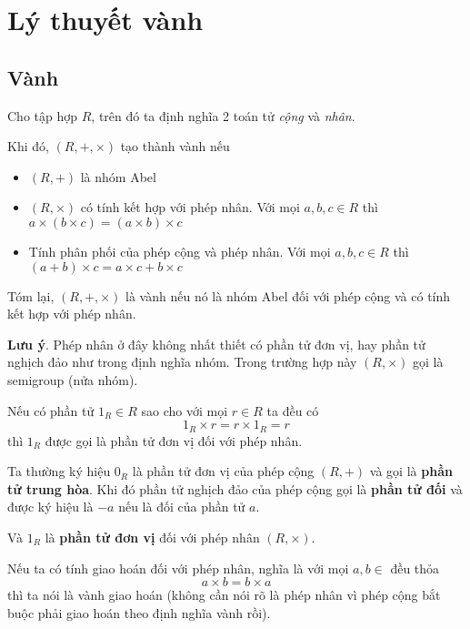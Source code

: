 \chapter{Lý thuyết vành}

\section{Vành}

\begin{definition}
    Cho tập hợp $R$, trên đó ta định nghĩa 2 toán tử \textit{cộng} và \textit{nhân}.

    Khi đó, $(R, +, \times)$ tạo thành vành nếu

    \begin{itemize}
        \item $(R, +)$ là nhóm Abel
        \item $(R, \times)$ có tính kết hợp với phép nhân. Với mọi $a, b, c \in R$ thì $a \times (b \times c) = (a \times b) \times c$
        \item Tính phân phối của phép cộng và phép nhân. Với mọi $a, b, c \in R$ thì $(a + b) \times c = a \times c + b \times c$
    \end{itemize}
\end{definition}

Tóm lại, $(R, +, \times)$ là vành nếu nó là nhóm Abel đối với phép cộng và có tính kết hợp với phép nhân.

\textbf{Lưu ý}. Phép nhân ở đây không nhất thiết có phần tử đơn vị, hay phần tử nghịch đảo như trong định nghĩa nhóm. Trong trường hợp này $(R, \times)$ gọi là semigroup (nửa nhóm).

\begin{definition} Nếu có phần tử $1_R \in R$ sao cho với mọi $r \in R$ ta đều có
    \[1_R \times r = r \times 1_R = r\]
    thì $1_R$ được gọi là phần tử đơn vị đối với phép nhân.
\end{definition}

Ta thường ký hiệu $0_R$ là phần tử đơn vị của phép cộng $(R, +)$ và gọi là \textbf{phần tử trung hòa}.
Khi đó phần tử nghịch đảo của phép cộng gọi là \textbf{phần tử đối} và được ký hiệu là $-a$ nếu là đối của phần tử $a$.

Và $1_R$ là \textbf{phần tử đơn vị} đối với phép nhân $(R, \times)$.

\begin{definition}
    Nếu ta có tính giao hoán đối với phép nhân, nghĩa là với mọi $a, b \in $ đều thỏa
    \[a \times b = b \times a\]
    thì ta nói là vành giao hoán (không cần nói rõ là phép nhân vì phép cộng bắt buộc phải giao hoán theo định nghĩa vành rồi).
\end{definition}